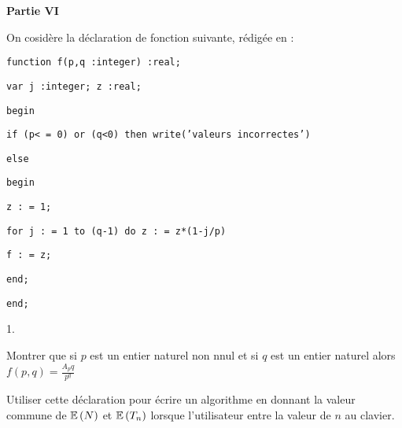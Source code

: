 \documentclass[11pt]{article}%
\begin{document}
\textbf{Partie VI}

On cosidère la déclaration de fonction suivante, rédigée en
\Scilab{} :

\texttt{function f(p,q :integer) :real;}

\texttt{var j :integer; z :real;}

\texttt{begin}

\texttt{\hspace{1cm}if (p< = 0) or (q<0) then write('valeurs
incorrectes')}

\texttt{\hspace{1cm}else }

\texttt{\hspace{1cm}begin}

\texttt{\hspace{2cm}z : = 1;}

\texttt{\hspace{2cm}for j : = 1 to (q-1) do z : = z*(1-j/p)}

\texttt{\hspace{2cm}f : = z;}

\texttt{\hspace{1cm}end;}

\texttt{end;}

\begin{noliste}{1.}
 \setlength{\itemsep}{4mm}
\item Montrer que si $p$ est un entier naturel non nnul et si $q$ est
un
entier naturel alors $ f\left( p,q\right) = \frac{A_{p}{q}}{p^{q}}$

\item Utiliser cette déclaration pour écrire un algorithme en
\Scilab{} donnant la valeur commune de $\mathbb{E}\left( N\right) $ et
$\mathbb{E}\left(
T_{n}\right) $ lorsque l'utilisateur entre la valeur de $n$ au clavier.
\end{noliste}
\end{document}
